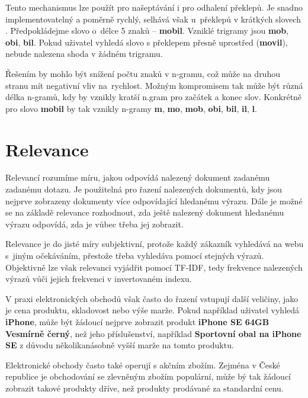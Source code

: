 \documentclass[FM,DP]{tulthesis}
\begin{document}
Tento mechanismus lze použít pro našeptávání i pro odhalení překlepů. Je snadno implementovatelný
a poměrně rychlý, selhává však u~překlepů v krátkých slovech \cite{n-gram}. Předpokládejme slovo 
o~délce 5 znaků -- \textbf{mobil}. Vzniklé trigramy jsou \textbf{mob}, \textbf{obi}, \textbf{bil}.
Pokud uživatel vyhledá slovo s překlepem přesně uprostřed (\textbf{movil}), nebude nalezena
shoda v žádném trigramu. 

Řešením by mohlo být snížení počtu znaků v n-gramu, což může na druhou stranu mít negativní 
vliv na~rychlost. Možným kompromisem tak může být různá délka n-gramů, kdy by vznikly kratší
n.gram pro začátek a konec slov. Konkrétně pro slovo \textbf{mobil} by tak vznikly n-gramy 
\textbf{m}, \textbf{mo}, \textbf{mob}, \textbf{obi}, \textbf{bil}, \textbf{il}, \textbf{l}.

\section{Relevance}

Relevancí rozumíme míru, jakou odpovídá nalezený dokument zadanému zadanému dotazu.
Je použitelná pro řazení nalezených dokumentů, kdy jsou nejprve zobrazeny dokumenty
více odpovídající hledanému výrazu. Dále je možné se na základě relevance rozhodnout, 
zda ještě nalezený dokument hledanému výrazu odpovídá, zda je vůbec třeba jej zobrazit.

Relevance je do jisté míry subjektivní, protože každý zákazník vyhledává na webu
s~jiným očekáváním, přestože třeba vyhledáva pomocí stejných výrazů. Objektivně lze však
relevanci vyjádřit pomocí TF-IDF, tedy frekvence nalezených výrazů vůči jejich frekvenci
v invertovaném indexu. 

V praxi elektronických obchodů však často do řazení
vstupují další veličiny, jako je cena produktu, skladovost nebo výše marže.
Pokud například uživatel vyhledá \textbf{iPhone}, může být žádoucí nejprve zobrazit
produkt \textbf{iPhone SE 64GB Vesmírně černý}, než jeho příslušenství, například
\textbf{Sportovní obal na iPhone SE} z důvodu několikanásobně vyšší marže na tomto produktu.

Elektronické obchody často také operují s akčním zbožím. Zejména v České republice je
obchodování se zlevněným zbožím populární, může bý tak žádoucí zobrazit takové produkty
dříve, než produkty prodávané za standardní cenu.
\end{document}
